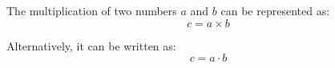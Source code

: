 \documentclass{article}
\begin{document}
The multiplication of two numbers \(a\) and \(b\) can be represented as:
\[
c = a \times b
\]

Alternatively, it can be written as:
\[
c = a \cdot b
\]
\end{document}
